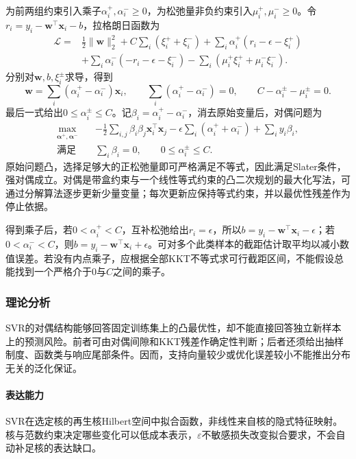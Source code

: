 为前两组约束引入乘子$\alpha_i^+,\alpha_i^-\geq0$，为松弛量非负约束引入$\mu_i^+,\mu_i^-\geq0$。令$r_i=y_i-\bm{w}^{\top}\bm{x}_i-b$，拉格朗日函数为
\[
  \begin{aligned}
    \mathcal{L}={}&\tfrac12\lVert\bm{w}\rVert_2^2
       +C\sum_i(\xi_i^++\xi_i^-)
       +\sum_i\alpha_i^+(r_i-\epsilon-\xi_i^+)\\
       &+\sum_i\alpha_i^-(-r_i-\epsilon-\xi_i^-)
       -\sum_i(\mu_i^+\xi_i^++\mu_i^-\xi_i^-).
  \end{aligned}
\]
分别对$\bm{w},b,\xi_i^\pm$求导，得到
\[
  \bm{w}=\sum_i(\alpha_i^+-\alpha_i^-)\bm{x}_i,\qquad
  \sum_i(\alpha_i^+-\alpha_i^-)=0,\qquad
  C-\alpha_i^\pm-\mu_i^\pm=0.
\]
最后一式给出$0\leq\alpha_i^\pm\leq C$。记$\beta_i=\alpha_i^+-\alpha_i^-$，消去原始变量后，对偶问题为
\begin{equation}
  \begin{aligned}
    \max_{\bm{\alpha}^+,\bm{\alpha}^-}\quad&
       -\tfrac12\sum_{i,j}\beta_i\beta_j\bm{x}_i^{\top}\bm{x}_j
       -\epsilon\sum_i(\alpha_i^++\alpha_i^-)
       +\sum_i y_i\beta_i,\\
    \text{满足}\quad&
       \sum_i\beta_i=0,\qquad 0\leq\alpha_i^\pm\leq C.
  \end{aligned}
  \label{eq:regression-svr-dual}
\end{equation}
原始问题凸，选择足够大的正松弛量即可严格满足不等式，因此满足Slater条件，强对偶成立。对偶是带盒约束与一个线性等式约束的凸二次规划的最大化写法，可通过分解算法逐步更新少量变量；每次更新应保持等式约束，并以最优性残差作为停止依据。

得到乘子后，若$0<\alpha_i^+<C$，互补松弛给出$r_i=\epsilon$，所以$b=y_i-\bm{w}^{\top}\bm{x}_i-\epsilon$；若$0<\alpha_i^-<C$，则$b=y_i-\bm{w}^{\top}\bm{x}_i+\epsilon$。可对多个此类样本的截距估计取平均以减小数值误差。若没有内点乘子，应根据全部KKT不等式求可行截距区间，不能假设总能找到一个严格介于$0$与$C$之间的乘子。

\subsubsection{理论分析}

SVR的对偶结构能够回答固定训练集上的凸最优性，却不能直接回答独立新样本上的预测风险。前者可由对偶间隙和KKT残差作确定性判断；后者还须给出抽样制度、函数类与响应尾部条件。因而，支持向量较少或优化误差较小不能推出分布无关的泛化保证。

\paragraph{表达能力}
SVR在选定核的再生核Hilbert空间中拟合函数，非线性来自核的隐式特征映射。核与范数约束决定哪些变化可以低成本表示，$\varepsilon$不敏感损失改变拟合要求，不会自动补足核的表达缺口。

